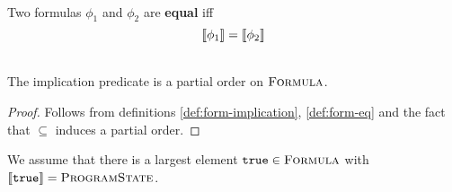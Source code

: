\begin{description}
    \begin{definition}~\\
        \label{def:form-eq}
        Two formulas $\phi_1$ and $\phi_2$ are \textbf{equal} iff
        \begin{displaymath}
        \llbracket {\phi_1} \rrbracket = \llbracket {\phi_2} \rrbracket
        \end{displaymath}
    \end{definition} 
    
    
    \begin{lemma}
        \label{lemma:po-form}~\\
        The implication predicate is a partial order on $\textup{\textsc{Formula}}$.
    \end{lemma}
    \begin{proof}%
        Follows from definitions \ref{def:form-implication}, \ref{def:form-eq} and the fact that $\subseteq$ induces a partial order.
    \end{proof}
    
    We assume that there is a largest element $\textup{\texttt{true}} \in \textup{\textsc{Formula}}$ with $\llbracket {\textup{\texttt{true}}} \rrbracket = \textup{\textsc{ProgramState}}$.
    
    \begin{comment}
    Note that the presence of an unsatisfiable formula (as invariant, pre-/postcondition, assertion, ...) in a sound verification system implies that the corresponding source code location is unreachable:
    Preservation guarantees that any reachable program state satisfies potentially annotated formulas, trivially ensuring that the formula is satisfiable.
    
    This property is true regardless of whether \svl forbids usage of unsatisfiable formulas entirely or whether it only fails when trying to use the corresponding code (which would involve proving that a satisfiable formula implies an unsatisfiable one).
    Therefore we will often restrict our reasoning on the satisfiable formulas $\setFormulaA$, without explicitly stating that the presence of an unsatisfiable formula would result in failure.
    \end{comment}
    

\end{description}
